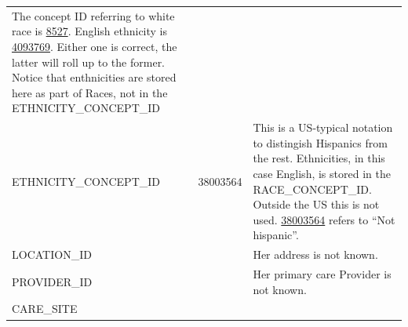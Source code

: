 \documentclass[11pt]{book}
\theoremstyle{definition}
\theoremstyle{definition}
\theoremstyle{definition}
\theoremstyle{remark}
\begin{document}
\begin{longtable}[]{@{}lll@{}}
\begin{minipage}[t]{0.49\columnwidth}
The concept ID referring to white race is \href{http://athena.ohdsi.org/search-terms/terms/8527}{8527}. English ethnicity is \href{http://athena.ohdsi.org/search-terms/terms/4093769}{4093769}. Either one is correct, the latter will roll up to the former. Notice that enthnicities are stored here as part of Races, not in the ETHNICITY\_CONCEPT\_ID\strut
\end{minipage}\tabularnewline
\begin{minipage}[t]{0.28\columnwidth}\raggedright
ETHNICITY\_CONCEPT\_ID\strut
\end{minipage} & \begin{minipage}[t]{0.15\columnwidth}\raggedright
38003564\strut
\end{minipage} & \begin{minipage}[t]{0.49\columnwidth}\raggedright
This is a US-typical notation to distingish Hispanics from the rest. Ethnicities, in this case English, is stored in the RACE\_CONCEPT\_ID. Outside the US this is not used. \href{http://athena.ohdsi.org/search-terms/terms/38003564}{38003564} refers to ``Not hispanic''.\strut
\end{minipage}\tabularnewline
\begin{minipage}[t]{0.28\columnwidth}\raggedright
LOCATION\_ID\strut
\end{minipage} & \begin{minipage}[t]{0.15\columnwidth}\raggedright
\strut
\end{minipage} & \begin{minipage}[t]{0.49\columnwidth}\raggedright
Her address is not known.\strut
\end{minipage}\tabularnewline
\begin{minipage}[t]{0.28\columnwidth}\raggedright
PROVIDER\_ID\strut
\end{minipage} & \begin{minipage}[t]{0.15\columnwidth}\raggedright
\strut
\end{minipage} & \begin{minipage}[t]{0.49\columnwidth}\raggedright
Her primary care Provider is not known.\strut
\end{minipage}\tabularnewline
\begin{minipage}[t]{0.28\columnwidth}\raggedright
CARE\_SITE\strut
\end{minipage} & \begin{minipage}[t]{0.15\columnwidth}\raggedright
\strut
\end{minipage} & \begin{minipage}[t]{0.49\columnwidth}\raggedright

\end{minipage}
\end{longtable}
\end{document}
